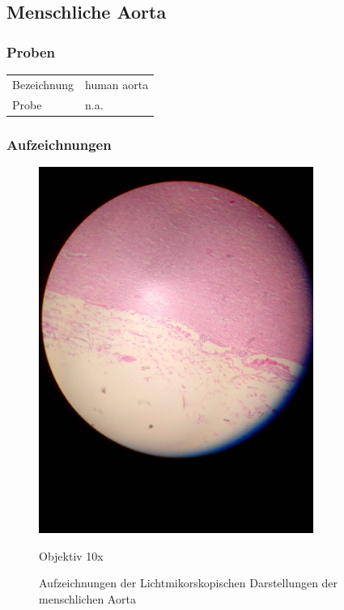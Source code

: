 \newpage
\subsection{Menschliche Aorta}

\subsubsection{Proben}
\begin{table}[h!]
	\centering
	\begin{tabular}{l l}
		Bezeichnung	& human aorta \\
		Probe 		& n.a.
	\end{tabular}
\end{table}

\subsubsection{Aufzeichnungen}
\begin{figure}[h!]
	\centering
		\includegraphics[angle=270, width=0.8\textwidth]{../images/01_aorta.jpg}
		\caption{Objektiv 10x}
	\caption{Aufzeichnungen der Lichtmikorskopischen Darstellungen der
		menschlichen Aorta}
\end{figure}


